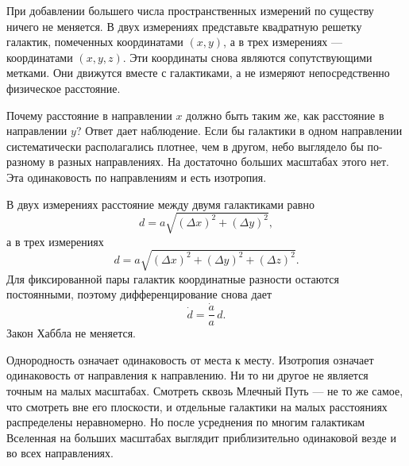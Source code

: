 При добавлении большего числа пространственных измерений по существу ничего не меняется. В двух измерениях представьте квадратную решетку галактик, помеченных координатами \((x,y)\), а в трех измерениях — координатами \((x,y,z)\). Эти координаты снова являются сопутствующими метками. Они движутся вместе с галактиками, а не измеряют непосредственно физическое расстояние.

Почему расстояние в направлении \(x\) должно быть таким же, как расстояние в направлении \(y\)? Ответ дает наблюдение. Если бы галактики в одном направлении систематически располагались плотнее, чем в другом, небо выглядело бы по-разному в разных направлениях. На достаточно больших масштабах этого нет. Эта одинаковость по направлениям и есть изотропия.

В двух измерениях расстояние между двумя галактиками равно
\begin{equation}
d=a\sqrt{(\Delta x)^2+(\Delta y)^2},
\end{equation}
а в трех измерениях
\begin{equation}
d=a\sqrt{(\Delta x)^2+(\Delta y)^2+(\Delta z)^2}.
\end{equation}
Для фиксированной пары галактик координатные разности остаются постоянными, поэтому дифференцирование снова дает
\begin{equation}
\dot d=\frac{\dot a}{a}\,d.
\end{equation}
Закон Хаббла не меняется.

Однородность означает одинаковость от места к месту. Изотропия означает одинаковость от направления к направлению. Ни то ни другое не является точным на малых масштабах. Смотреть сквозь Млечный Путь — не то же самое, что смотреть вне его плоскости, и отдельные галактики на малых расстояниях распределены неравномерно. Но после усреднения по многим галактикам Вселенная на больших масштабах выглядит приблизительно одинаковой везде и во всех направлениях.

\begin{classroomqa}
\end{classroomqa}

